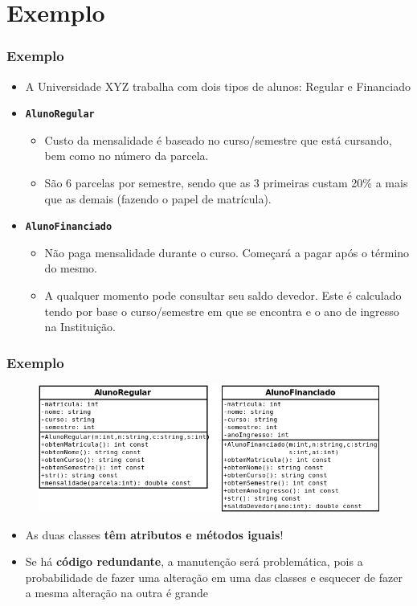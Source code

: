\documentclass[aspectratio=169]{beamer}
\begin{document}
\section{Exemplo}

\begin{frame}\frametitle{Exemplo}
\begin{itemize}
	\item A Universidade XYZ trabalha com dois tipos de alunos: Regular e Financiado
	\item \textbf{\texttt{AlunoRegular}}
	\begin{itemize}
		\item Custo da mensalidade é baseado no curso/semestre que está cursando, bem como no número da parcela.
		\item São 6 parcelas por semestre, sendo que as 3 primeiras custam 20\% a mais que as demais (fazendo o papel de matrícula).
	\end{itemize}
	\item \textbf{\texttt{AlunoFinanciado}}
	\begin{itemize}
		\item Não paga mensalidade durante o curso. Começará a pagar após o término do mesmo.
		\item A qualquer momento pode consultar seu saldo devedor. Este é calculado tendo por base o curso/semestre em que se encontra e o ano de ingresso na Instituição.
	\end{itemize}
\end{itemize}
\end{frame}

\begin{frame}\frametitle{Exemplo}
\begin{figure}[h]
	\includegraphics[height=0.45\paperheight]{pucrs-ec-poo-unidade_13-heranca-laminas-exemplo_aluno.png}
\end{figure}
\begin{itemize}
	\item As duas classes \textbf{têm atributos e métodos iguais}!
	\item Se há \textbf{código redundante}, a manutenção será problemática, pois a probabilidade de fazer uma alteração em uma
das classes e esquecer de fazer a mesma alteração na outra é grande
\end{itemize}
\end{frame}
\end{document}
